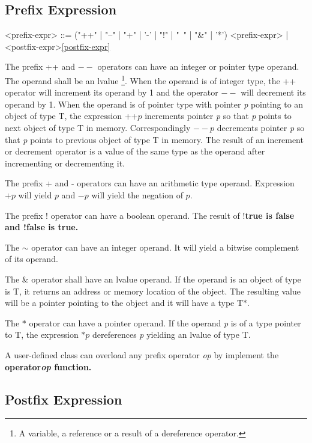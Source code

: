 \documentclass[a4paper,oneside,11pt]{article}
\begin{document}
\subsection{Prefix Expression}

\begin{grammar}
\label{prefix-expr}<prefix-expr> ::= ("++" | "--" | "+" | '-' | "!" | "~" | "\&" | '*') <prefix-expr> | <postfix-expr>\ref{postfix-expr}
\end{grammar}

The prefix ++ and $--$ operators can have an integer or pointer type operand.
The operand shall be an lvalue \footnote{A variable, a reference or a result of a dereference operator.}.
When the operand is of integer type, the ++ operator will increment its operand by 1 and the operator $--$ will decrement its operand by 1.
When the operand is of pointer type with pointer \emph{p} pointing to an object of type T,
the expression ++$p$ increments pointer \emph{p} so that \emph{p} points to next object of type T in memory.
Correspondingly $--p$ decrements pointer \emph{p} so that \emph{p} points to previous object of type T in memory.
The result of an increment or decrement operator is a value of the same type as the operand after incrementing or decrementing it.

The prefix + and - operators can have an arithmetic type operand.
Expression $+p$ will yield $p$ and $-p$ will yield the negation of $p$.

The prefix ! operator can have a boolean operand. The result of !\bf{true} is \bf{false} and !\bf{false} is \bf{true}.

The $\sim$ operator can have an integer operand. It will yield a bitwise complement of its operand.

The \& operator shall have an lvalue operand.
If the operand is an object of type is T, it returns an address or memory location of the object.
The resulting value will be a pointer pointing to the object and it will have a type T$*$.

The $*$ operator can have a pointer operand. If the operand \emph{p} is of a type pointer to T,
the expression $*p$ dereferences \emph{p} yielding an lvalue of type T.

A user-defined class can overload any prefix operator \emph{op} by implement the \bf{operator\emph{op}} function.

\subsection{Postfix Expression}
\end{document}
